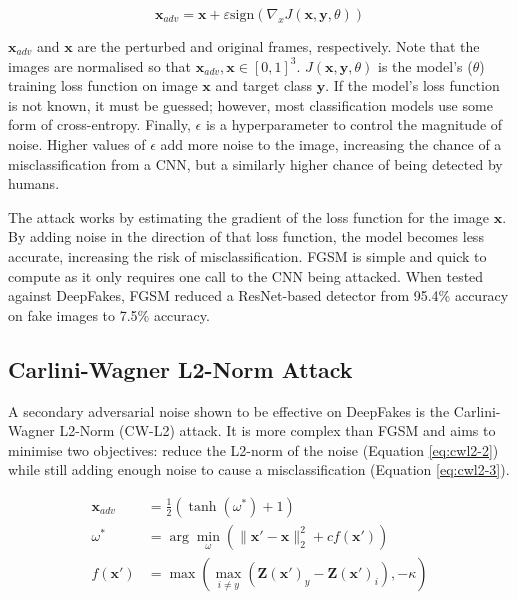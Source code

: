 \begin{equation}
    \label{eq:fgsm}
    \mathbf{x}_{adv} = \mathbf{x} + \varepsilon \text{sign}(\nabla_x J(\mathbf{x},\mathbf{y}, \theta))
\end{equation}

$\mathbf{x}_{adv}$ and $\mathbf{x}$ are the perturbed and original frames, respectively. Note that the images are normalised so that $\mathbf{x}_{adv}, \mathbf{x}\in[0,1]^3$. $J(\mathbf{x},\mathbf{y}, \theta)$ is the model's ($\theta$) training loss function on image $\textbf{x}$ and target class $\textbf{y}$. If the model's loss function is not known, it must be guessed; however, most classification models use some form of cross-entropy. Finally, $\epsilon$ is a hyperparameter to control the magnitude of noise. Higher values of $\epsilon$ add more noise to the image, increasing the chance of a misclassification from a CNN, but a similarly higher chance of being detected by humans.

The attack works by estimating the gradient of the loss function for the image $\textbf{x}$. By adding noise in the direction of that loss function, the model becomes less accurate, increasing the risk of misclassification. FGSM is simple and quick to compute as it only requires one call to the CNN being attacked. When tested against DeepFakes, FGSM reduced a ResNet-based detector from 95.4\% accuracy on fake images to 7.5\% accuracy\cite{gandhi2020adversarial}.

\subsection{Carlini-Wagner L2-Norm Attack}

A secondary adversarial noise shown to be effective on DeepFakes is the Carlini-Wagner L2-Norm (CW-L2) attack\cite{carlini2017towards}. It is more complex than FGSM and aims to minimise two objectives: reduce the L2-norm of the noise (Equation \ref{eq:cwl2-2}) while still adding enough noise to cause a misclassification (Equation \ref{eq:cwl2-3}).

\begin{align}
    \mathbf{x}_{adv} &= \frac{1}{2} \left( \tanh(\omega^*) + 1 \right) \label{eq:cwl2-1}\\
    \omega^* &= \arg\min_\omega \left( \|\mathbf{x'} - \mathbf{x}\|_2^2 + c f(\mathbf{x'}) \right) \label{eq:cwl2-2}\\
    f(\mathbf{x'}) &= \max\left( \max_{i \neq y} \left( \mathbf{Z}(\mathbf{x'})_y - \mathbf{Z}(\mathbf{x'})_i \right), -\kappa \right) \label{eq:cwl2-3}
\end{align}

